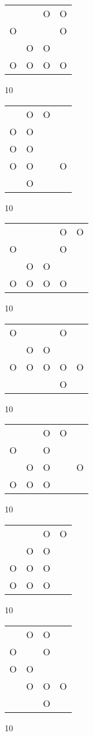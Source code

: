 \begin{tabular}{|m{0.2cm}m{0.2cm}m{0.2cm}m{0.2cm}|}\hline
 & &O&O\\
O& & &O\\
 &O&O& \\
O&O&O&O\\
\hline\end{tabular}10
\begin{tabular}{|m{0.2cm}m{0.2cm}m{0.2cm}m{0.2cm}|}\hline
 &O&O& \\
O&O& & \\
O&O& & \\
O&O& &O\\
 &O& & \\
\hline\end{tabular}10
\begin{tabular}{|m{0.2cm}m{0.2cm}m{0.2cm}m{0.2cm}m{0.2cm}|}\hline
 & & &O&O\\
O& & &O& \\
 &O&O& & \\
O&O&O&O& \\
\hline\end{tabular}10
\begin{tabular}{|m{0.2cm}m{0.2cm}m{0.2cm}m{0.2cm}m{0.2cm}|}\hline
O& & &O& \\
 &O&O& & \\
O&O&O&O&O\\
 & & &O& \\
\hline\end{tabular}10
\begin{tabular}{|m{0.2cm}m{0.2cm}m{0.2cm}m{0.2cm}m{0.2cm}|}\hline
 & &O&O& \\
O& &O& & \\
 &O&O& &O\\
O&O&O& & \\
\hline\end{tabular}10
\begin{tabular}{|m{0.2cm}m{0.2cm}m{0.2cm}m{0.2cm}|}\hline
 & &O&O\\
 &O&O& \\
O&O&O& \\
O&O&O& \\
\hline\end{tabular}10
\begin{tabular}{|m{0.2cm}m{0.2cm}m{0.2cm}m{0.2cm}|}\hline
 &O&O& \\
O& &O& \\
O&O& & \\
 &O&O&O\\
 & &O& \\
\hline\end{tabular}10
